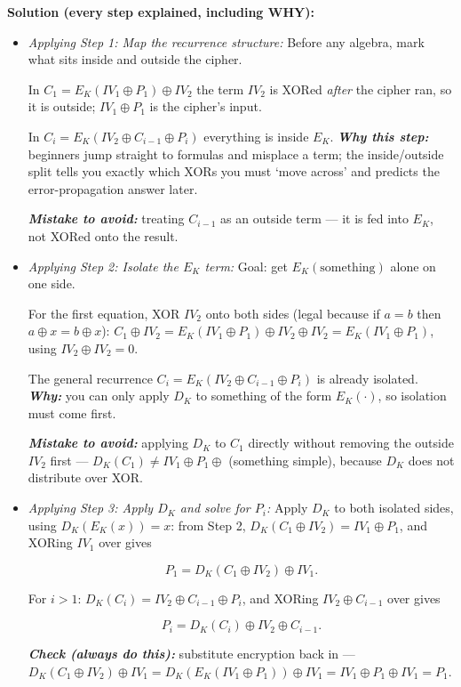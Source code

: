 \documentclass[12pt, a4paper]{article}
\newcommand{\term}[1]{\textbf{\textit{#1}}}        %
\begin{document}
\textbf{Solution (every step explained, including WHY):}
\begin{itemize}
    \item \textit{Applying Step 1: Map the recurrence structure:} Before any algebra, mark what sits inside and outside the cipher.

    In $C_1 = E_K(IV_1 \oplus P_1) \oplus IV_2$ the term $IV_2$ is XORed \emph{after} the cipher ran, so it is outside; $IV_1 \oplus P_1$ is the cipher's input.

    In $C_i = E_K(IV_2 \oplus C_{i-1} \oplus P_i)$ everything is inside $E_K$. \term{Why this step:} beginners jump straight to formulas and misplace a term; the inside/outside split tells you exactly which XORs you must `move across' and predicts the error-propagation answer later.

    \term{Mistake to avoid:} treating $C_{i-1}$ as an outside term --- it is fed into $E_K$, not XORed onto the result.
    \item \textit{Applying Step 2: Isolate the $E_K$ term:} Goal: get $E_K(\text{something})$ alone on one side.

    For the first equation, XOR $IV_2$ onto both sides (legal because if $a = b$ then $a \oplus x = b \oplus x$): $C_1 \oplus IV_2 = E_K(IV_1 \oplus P_1) \oplus IV_2 \oplus IV_2 = E_K(IV_1 \oplus P_1)$, using $IV_2 \oplus IV_2 = 0$.

    The general recurrence $C_i = E_K(IV_2 \oplus C_{i-1} \oplus P_i)$ is already isolated. \term{Why:} you can only apply $D_K$ to something of the form $E_K(\cdot)$, so isolation must come first.

    \term{Mistake to avoid:} applying $D_K$ to $C_1$ directly without removing the outside $IV_2$ first --- $D_K(C_1) \neq IV_1 \oplus P_1 \oplus$ (something simple), because $D_K$ does not distribute over XOR.
    \item \textit{Applying Step 3: Apply $D_K$ and solve for $P_i$:} Apply $D_K$ to both isolated sides, using $D_K(E_K(x)) = x$: from Step 2, $D_K(C_1 \oplus IV_2) = IV_1 \oplus P_1$, and XORing $IV_1$ over gives

\[
P_1 = D_K(C_1 \oplus IV_2) \oplus IV_1.
\]

For $i > 1$: $D_K(C_i) = IV_2 \oplus C_{i-1} \oplus P_i$, and XORing $IV_2 \oplus C_{i-1}$ over gives

\[
P_i = D_K(C_i) \oplus IV_2 \oplus C_{i-1}.
\]

\term{Check (always do this):} substitute encryption back in --- $D_K(C_1 \oplus IV_2) \oplus IV_1 = D_K(E_K(IV_1 \oplus P_1)) \oplus IV_1 = IV_1 \oplus P_1 \oplus IV_1 = P_1$.


\end{itemize}
\end{document}
